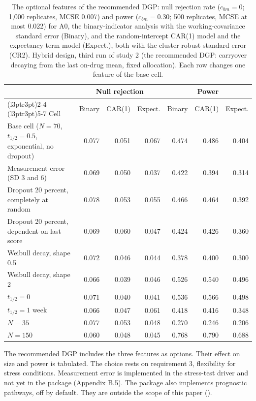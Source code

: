 \documentclass[
  11pt,
]{article}
\begin{document}
\begin{table}
\centering
\caption{\label{tab:options}The optional features of the recommended DGP: null rejection rate ($c_{bm} = 0$; 1,000 replicates, MCSE 0.007) and power ($c_{bm} = 0.30$; 500 replicates, MCSE at most 0.022) for A0, the binary-indicator analysis with the working-covariance standard error (Binary), and the random-intercept CAR(1) model and the expectancy-term model (Expect.), both with the cluster-robust standard error (CR2). Hybrid design, third run of study 2 (the recommended DGP: carryover decaying from the last on-drug mean, fixed allocation). Each row changes one feature of the base cell.}
\centering
\fontsize{9}{11}\selectfont
\begin{tabular}[t]{>{\raggedright\arraybackslash}p{4.5cm}rrrrrr}
\toprule
\multicolumn{1}{c}{ } & \multicolumn{3}{c}{Null rejection} & \multicolumn{3}{c}{Power} \\
\cmidrule(l{3pt}r{3pt}){2-4} \cmidrule(l{3pt}r{3pt}){5-7}
Cell & Binary & CAR(1) & Expect. & Binary & CAR(1) & Expect.\\
\midrule
Base cell ($N = 70$, $t_{1/2} = 0.5$, exponential, no dropout) & 0.077 & 0.051 & 0.067 & 0.474 & 0.486 & 0.404\\
Measurement error (SD 3 and 6) & 0.069 & 0.050 & 0.037 & 0.422 & 0.394 & 0.314\\
Dropout 20 percent, completely at random & 0.078 & 0.053 & 0.055 & 0.466 & 0.464 & 0.392\\
Dropout 20 percent, dependent on last score & 0.069 & 0.060 & 0.047 & 0.424 & 0.426 & 0.360\\
Weibull decay, shape 0.5 & 0.072 & 0.046 & 0.044 & 0.378 & 0.400 & 0.300\\
Weibull decay, shape 2 & 0.066 & 0.039 & 0.046 & 0.526 & 0.540 & 0.496\\
$t_{1/2} = 0$ & 0.071 & 0.040 & 0.041 & 0.536 & 0.566 & 0.498\\
$t_{1/2} = 1$ week & 0.066 & 0.047 & 0.061 & 0.418 & 0.416 & 0.348\\
$N = 35$ & 0.077 & 0.053 & 0.048 & 0.270 & 0.246 & 0.206\\
$N = 150$ & 0.060 & 0.048 & 0.045 & 0.768 & 0.790 & 0.688\\
\bottomrule
\end{tabular}
\end{table}

The recommended DGP includes the three features as options. Their
effect on size and power is tabulated. The choice rests on
requirement 3, flexibility for stress conditions. Measurement error is
implemented in the stress-test driver and not yet in the package
(Appendix B.5). The package also implements prognostic pathways, off
by default. They are outside the scope of this paper
().
\end{document}
